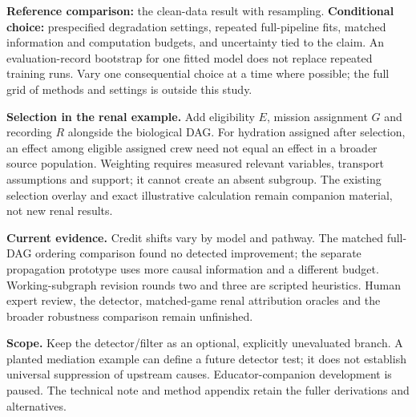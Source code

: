 \documentclass[11pt,letterpaper]{article}
\begin{document}
\textbf{Reference comparison:} the clean-data result with resampling. \textbf{Conditional choice:} prespecified degradation settings, repeated full-pipeline fits, matched information and computation budgets, and uncertainty tied to the claim. An evaluation-record bootstrap for one fitted model does not replace repeated training runs. Vary one consequential choice at a time where possible; the full grid of methods and settings is outside this study.

\textbf{Selection in the renal example.} Add eligibility $E$, mission assignment $G$ and recording $R$ alongside the biological DAG. For hydration assigned after selection, an effect among eligible assigned crew need not equal an effect in a broader source population. Weighting requires measured relevant variables, transport assumptions and support; it cannot create an absent subgroup. The existing selection overlay and exact illustrative calculation remain companion material, not new renal results.

\textbf{Current evidence.} Credit shifts vary by model and pathway. The matched full-DAG ordering comparison found no detected improvement; the separate propagation prototype uses more causal information and a different budget. Working-subgraph revision rounds two and three are scripted heuristics. Human expert review, the detector, matched-game renal attribution oracles and the broader robustness comparison remain unfinished.

\textbf{Scope.} Keep the detector/filter as an optional, explicitly unevaluated branch. A planted mediation example can define a future detector test; it does not establish universal suppression of upstream causes. Educator-companion development is paused. The technical note and method appendix retain the fuller derivations and alternatives.

\clearpage
\small


\end{document}
